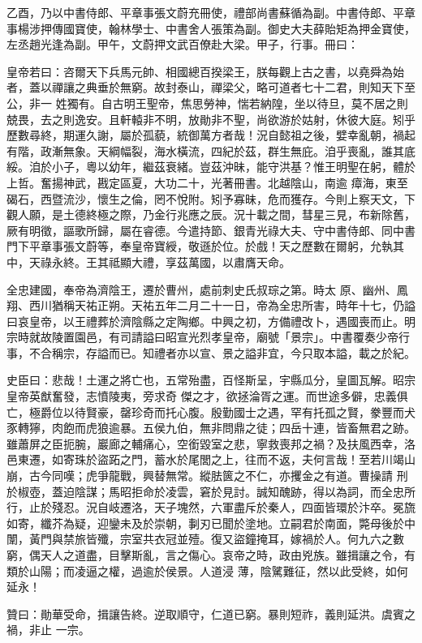 \begin{pinyinscope}
 乙酉，乃以中書侍郎、平章事張文蔚充冊使，禮部尚書蘇循為副。中書侍郎、平章事楊涉押傳國寶使，翰林學士、中書舍人張策為副。御史大夫薛貽矩為押金寶使，左丞趙光逢為副。甲午，文蔚押文武百僚赴大梁。甲子，行事。冊曰：



 皇帝若曰：咨爾天下兵馬元帥、相國總百揆梁王，朕每觀上古之書，以堯舜為始者，蓋以禪讓之典垂於無窮。故封泰山，禪梁父，略可道者七十二君，則知天下至公，非一
 姓獨有。自古明王聖帝，焦思勞神，惴若納隍，坐以待旦，莫不居之則兢畏，去之則逸安。且軒轅非不明，放勛非不聖，尚欲游於姑射，休彼大庭。矧乎歷數尋終，期運久謝，屬於孤藐，統御萬方者哉！況自懿祖之後，嬖幸亂朝，禍起有階，政漸無象。天綱幅裂，海水橫流，四紀於茲，群生無庇。洎乎喪亂，誰其底綏。洎於小子，粵以幼年，繼茲衰緒。豈茲沖昧，能守洪基？惟王明聖在躬，體於上哲。奮揚神武，戡定區夏，大功二十，光著冊書。北越陰山，南逾
 瘴海，東至碣石，西暨流沙，懷生之倫，罔不悅附。矧予寡昧，危而獲存。今則上察天文，下觀人願，是土德終極之際，乃金行兆應之辰。況十載之間，彗星三見，布新除舊，厥有明徵，謳歌所歸，屬在睿德。今遣持節、銀青光祿大夫、守中書侍郎、同中書門下平章事張文蔚等，奉皇帝寶綬，敬遜於位。於戲！天之歷數在爾躬，允執其中，天祿永終。王其祗顯大禮，享茲萬國，以肅膺天命。



 全忠建國，奉帝為濟陰王，遷於曹州，處前刺史氏叔琮之第。時太
 原、幽州、鳳翔、西川猶稱天祐正朔。天祐五年二月二十一日，帝為全忠所害，時年十七，仍謚曰哀皇帝，以王禮葬於濟陰縣之定陶鄉。中興之初，方備禮改卜，遇國喪而止。明宗時就故陵置園邑，有司請謚曰昭宣光烈孝皇帝，廟號「景宗」。中書覆奏少帝行事，不合稱宗，存謚而已。知禮者亦以宣、景之謚非宜，今只取本謚，載之於紀。



 史臣曰：悲哉！土運之將亡也，五常殆盡，百怪斯呈，宇縣瓜分，皇圖瓦解。昭宗皇帝英猷奮發，志憤陵夷，旁求奇
 傑之才，欲拯淪胥之運。而世途多僻，忠義俱亡，極爵位以待賢豪，罄珍奇而托心腹。殷勤國士之遇，罕有托孤之賢，豢豐而犬豕轉獰，肉飽而虎狼逾暴。五侯九伯，無非問鼎之徒；四岳十連，皆畜無君之跡。雖蕭屏之臣扼腕，巖廊之輔痛心，空銜毀室之悲，寧救喪邦之禍？及扶風西幸，洛邑東遷，如寄珠於盜跖之門，蓄水於尾閭之上，往而不返，夫何言哉！至若川竭山崩，古今同嘆；虎爭龍戰，興替無常。縱胠篋之不仁，亦攫金之有道。曹操請
 刑於椒壺，蓋迫陰謀；馬昭拒命於凌雲，窘於見討。誠知醜跡，得以為詞，而全忠所行，止於殘忍。況自岐遷洛，天子塊然，六軍盡斥於秦人，四面皆環於汴卒。冕旒如寄，纖芥為疑，迎鑾未及於崇朝，剚刃已聞於塗地。立嗣君於南面，斃母後於中闈，黃門與禁旅皆殲，宗室共衣冠並殪。復又盜鐘掩耳，嫁禍於人。何九六之數窮，偶天人之道盡，目擊斯亂，言之傷心。哀帝之時，政由兇族。雖揖讓之令，有類於山陽；而凌逼之權，過逾於侯景。人道浸
 薄，陰騭難征，然以此受終，如何延永！



 贊曰：勛華受命，揖讓告終。逆取順守，仁道已窮。暴則短祚，義則延洪。虞賓之禍，非止
 一宗。



\end{pinyinscope}